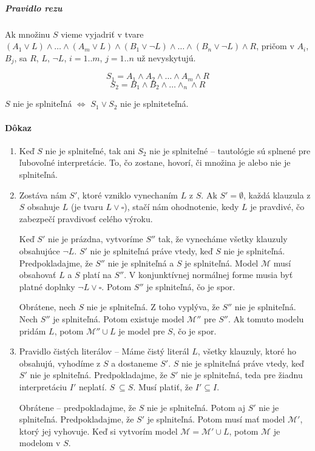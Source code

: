 \subparagraph{Pravidlo rezu} Ak množinu $S$ vieme vyjadriť v tvare $(A_1 \lor L)
\land \ldots \land (A_m \lor L) \land (B_1 \lor \neg L) \land \ldots \land (B_n
\lor \neg L) \land R$, pričom v $A_i$, $B_j$, sa $R$, $L$, $\neg L$, $i=1..m$,
$j=1..n$ už nevyskytujú.

$$S_1 = A_1 \land A_2 \land \ldots \land A_m \land R$$
$$S_2 = B_1 \land B_2 \land \ldots \land _n \land R$$

$S$ nie je splniteľná $\iff$ $S_1 \lor S_2$ nie je splniteteľná.

\paragraph{Dôkaz}
\begin{enumerate}
	\item Keď $S$ nie je splniteľné, tak ani $S_2$ nie je splniteľné --
	tautológie sú splnené pre ľubovoľné interpretácie. To, čo zostane,
	hovorí, či množina je alebo nie je splniteľná.
	\item Zostáva nám $S'$, ktoré vzniklo vynechaním $L$ z $S$. Ak
	$S'=\emptyset$, každá klauzula z $S$ obsahuje $L$ (je tvaru $L \lor
	\square$), stačí nám ohodnotenie, kedy $L$ je pravdivé, čo zabezpečí
	pravdivosť celého výroku. 
	\par
	Keď $S'$ nie je prázdna, vytvoríme $S''$ tak,
	že vynecháme všetky klauzuly obsahujúce $\neg L$. $S'$ nie je splniteľná
	práve vtedy, keď $S$ nie je splniteľná. Predpokladajme, že $S''$ nie je
	splniteľná a $S$ je splniteľná. Model $\mathcal{M}$ musí obsahovať $L$ a
	$S$ platí na $S''$.
	V konjunktívnej normálnej forme musia byť platné doplnky $\neg L \lor
	\square$. Potom $S''$ je splniteľná, čo je spor.

	\par Obrátene, nech $S$ nie je splniteľná. Z toho vyplýva, že $S''$ nie
	je splniteľná. Nech $S''$ je splniteľná. Potom existuje model
	$\mathcal{M}''$ pre $S''$. Ak tomuto modelu pridám $L$, potom
	$\mathcal{M}'' \cup L$ je model pre $S$, čo je spor.

	\item Pravidlo čistých literálov -- Máme čistý literál $L$, všetky
	klauzuly, ktoré ho obsahujú, vyhodíme z $S$ a dostaneme $S'$. $S$ nie je
	splniteľná práve vtedy, keď $S'$ nie je splniteľná. Predpokladajme, že
	$S'$ nie je splniteľná, teda pre žiadnu interpretáciu $I'$ neplatí. $S\
	\subseteq S$. Musí platiť, že $I' \subseteq I$.

	\par Obrátene -- predpokladajme, že $S$ nie je splniteľná. Potom aj $S'$
	nie je splniteľná. Predpokladajme, že $S'$ je splniteľná. Potom musí mať
	model $\mathcal{M}'$, ktorý jej vyhovuje. Keď si vytvorím model
	$\mathcal{M}=\mathcal{M}'\cup L$, potom $\mathcal{M}$ je modelom v $S$.


\end{enumerate}
